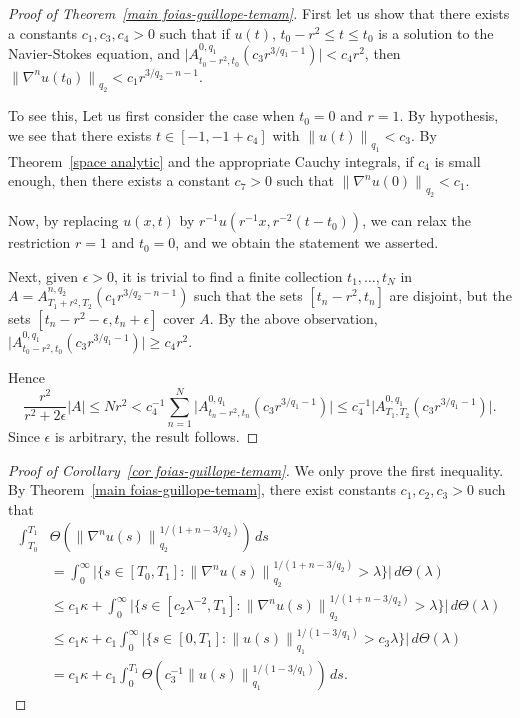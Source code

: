\documentclass[12pt]{amsart}
\theoremstyle{remark}
\newcommand{\smodo}[1]{{\mathopen|#1\mathclose|}}
\newcommand{\snormo}[1]{{\mathopen\|#1\mathclose\|}}
\begin{document}
\begin{proof}[Proof of Theorem~\ref{main foias-guillope-temam}]
First let us show that
there exists
a constants $c_1,c_3,c_4>0$ such that 
if $u(t)$, $t_0-r^2 \le t \le t_0$ 
is a solution to the Navier-Stokes equation,
and 
$\smodo{A^{0,q_1}_{t_0-r^2,t_0}(c_3 r^{3/q_1-1})} < c_4 r^2$, then
$\snormo{\nabla^n u(t_0)}_{q_2} < c_1 r^{3/q_2-n-1}$.

To see this,
Let us first consider the case when $t_0 = 0$ and $r = 1$.
By hypothesis, we see that there exists
$t \in [-1,-1+c_4]$
with
$ \snormo{u(t)}_{q_1} < c_3$.  
By Theorem~\ref{space analytic} and the appropriate Cauchy integrals, 
if $c_4$
is small enough, then there exists a constant $c_7>0$ such that
$\snormo{\nabla^n u(0)}_{q_2} < c_1$.  

Now, by replacing 
$u(x,t)$
by
$r^{-1} u(r^{-1}x,r^{-2}(t-t_0))$, we can relax the restriction $r=1$ and
$t_0=0$, and we obtain the statement we asserted.

Next, given $\epsilon>0$,
it is trivial to find a finite collection $t_1,\dots,t_N$
in $A = A^{n,q_2}_{T_1+r^2,T_2}(c_1 r^{3/q_2-n-1})$
such that the sets $[t_n-r^2,t_n]$ are disjoint, but the sets
$[t_n-r^2-\epsilon,t_n+\epsilon]$ cover $A$.
By the above observation,
$\smodo{A^{0,q_1}_{t_0-r^2,t_0}(c_3 r^{3/q_1-1})} \ge c_4 r^2$.

Hence
$$
   \frac{r^2}{r^2+2\epsilon}\smodo{A}
   \le
   N r^2
   <
   c_4^{-1} 
   \sum_{n=1}^N 
   \smodo{A^{0,q_1}_{t_n-r^2,t_n}(c_3 r^{3/q_1-1})} 
   \le
   c_4^{-1} 
   \smodo{A^{0,q_1}_{T_1,T_2}(c_3 r^{3/q_1-1})} .
$$
Since $\epsilon$ is arbitrary, the result follows.
\end{proof}

\begin{proof}[Proof of Corollary~\ref{cor foias-guillope-temam}]
We only prove the first inequality.  By 
Theorem~\ref{main foias-guillope-temam}, there exist constants 
$c_1,c_2,c_3>0$ such
that
\begin{align*}
   \int_{T_0}^{T_1}&\Theta(\snormo{\nabla^n u(s)}_{q_2}^{1/(1+n-3/q_2)}) \, ds\\
   &=
   \int_0^\infty \smodo{\{s\in[T_0,T_1] : 
   \snormo{\nabla^n u(s)}_{q_2}^{1/(1+n-3/q_2)}>\lambda\}} \, d\Theta(\lambda)\\
   &\le
   c_1\kappa + 
   \int_0^\infty \smodo{\{s\in[c_2 \lambda^{-2},T_1] : 
   \snormo{\nabla^n u(s)}_{q_2}^{1/(1+n-3/q_2)}>\lambda\}} \, d\Theta(\lambda)\\
   &\le
   c_1 \kappa +
   c_1 \int_0^\infty \smodo{\{s\in[0,T_1] : 
   \snormo{u(s)}_{q_1}^{1/(1-3/q_1)} > c_3 \lambda\}} \, d\Theta(\lambda)\\
   &= 
   c_1 \kappa + c_1 \int_0^{T_1} 
   \Theta(c_3^{-1}\snormo{u(s)}_{q_1}^{1/(1-3/q_1)}) \, ds .
\end{align*}
\end{proof}
\end{document}
